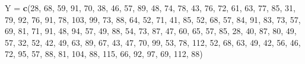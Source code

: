 \documentclass[
]{book}
\newenvironment{Shaded}{\begin{snugshade}}{\end{snugshade}}
\newcommand{\DecValTok}[1]{\textcolor[rgb]{0.00,0.00,0.81}{#1}}
\newcommand{\FunctionTok}[1]{\textcolor[rgb]{0.13,0.29,0.53}{\textbf{#1}}}
\newcommand{\NormalTok}[1]{#1}
\newcommand{\OtherTok}[1]{\textcolor[rgb]{0.56,0.35,0.01}{#1}}
\begin{document}
\begin{Shaded}
\begin{Highlighting}[]
\NormalTok{Y }\OtherTok{=} \FunctionTok{c}\NormalTok{(}\DecValTok{28}\NormalTok{, }\DecValTok{68}\NormalTok{, }\DecValTok{59}\NormalTok{, }\DecValTok{91}\NormalTok{, }\DecValTok{70}\NormalTok{, }\DecValTok{38}\NormalTok{, }\DecValTok{46}\NormalTok{, }\DecValTok{57}\NormalTok{, }\DecValTok{89}\NormalTok{, }\DecValTok{48}\NormalTok{, }\DecValTok{74}\NormalTok{, }\DecValTok{78}\NormalTok{, }\DecValTok{43}\NormalTok{, }\DecValTok{76}\NormalTok{, }\DecValTok{72}\NormalTok{, }\DecValTok{61}\NormalTok{, }\DecValTok{63}\NormalTok{, }\DecValTok{77}\NormalTok{, }
      \DecValTok{85}\NormalTok{, }\DecValTok{31}\NormalTok{, }\DecValTok{79}\NormalTok{, }\DecValTok{92}\NormalTok{, }\DecValTok{76}\NormalTok{, }\DecValTok{91}\NormalTok{, }\DecValTok{78}\NormalTok{, }\DecValTok{103}\NormalTok{, }\DecValTok{99}\NormalTok{, }\DecValTok{73}\NormalTok{, }\DecValTok{88}\NormalTok{, }\DecValTok{64}\NormalTok{, }\DecValTok{52}\NormalTok{, }\DecValTok{71}\NormalTok{, }\DecValTok{41}\NormalTok{, }\DecValTok{85}\NormalTok{, }\DecValTok{52}\NormalTok{, }\DecValTok{68}\NormalTok{, }
      \DecValTok{57}\NormalTok{, }\DecValTok{84}\NormalTok{, }\DecValTok{91}\NormalTok{, }\DecValTok{83}\NormalTok{, }\DecValTok{73}\NormalTok{, }\DecValTok{57}\NormalTok{, }\DecValTok{69}\NormalTok{, }\DecValTok{81}\NormalTok{, }\DecValTok{71}\NormalTok{, }\DecValTok{91}\NormalTok{, }\DecValTok{48}\NormalTok{, }\DecValTok{94}\NormalTok{, }\DecValTok{57}\NormalTok{, }\DecValTok{49}\NormalTok{, }\DecValTok{88}\NormalTok{, }\DecValTok{54}\NormalTok{, }\DecValTok{73}\NormalTok{, }
      \DecValTok{87}\NormalTok{, }\DecValTok{47}\NormalTok{, }\DecValTok{60}\NormalTok{, }\DecValTok{65}\NormalTok{, }\DecValTok{57}\NormalTok{, }\DecValTok{85}\NormalTok{, }\DecValTok{28}\NormalTok{, }\DecValTok{40}\NormalTok{, }\DecValTok{87}\NormalTok{, }\DecValTok{80}\NormalTok{, }\DecValTok{49}\NormalTok{, }\DecValTok{57}\NormalTok{, }\DecValTok{32}\NormalTok{, }\DecValTok{52}\NormalTok{, }\DecValTok{42}\NormalTok{, }\DecValTok{49}\NormalTok{, }\DecValTok{63}\NormalTok{, }\DecValTok{89}\NormalTok{, }
      \DecValTok{67}\NormalTok{, }\DecValTok{43}\NormalTok{, }\DecValTok{47}\NormalTok{, }\DecValTok{70}\NormalTok{, }\DecValTok{99}\NormalTok{, }\DecValTok{53}\NormalTok{, }\DecValTok{78}\NormalTok{, }\DecValTok{112}\NormalTok{, }\DecValTok{52}\NormalTok{, }\DecValTok{68}\NormalTok{, }\DecValTok{63}\NormalTok{, }\DecValTok{49}\NormalTok{, }\DecValTok{42}\NormalTok{, }
      \DecValTok{56}\NormalTok{, }\DecValTok{46}\NormalTok{, }\DecValTok{72}\NormalTok{, }\DecValTok{95}\NormalTok{, }\DecValTok{57}\NormalTok{, }\DecValTok{88}\NormalTok{, }\DecValTok{81}\NormalTok{, }\DecValTok{104}\NormalTok{, }\DecValTok{88}\NormalTok{, }\DecValTok{115}\NormalTok{, }\DecValTok{66}\NormalTok{, }\DecValTok{92}\NormalTok{, }\DecValTok{97}\NormalTok{, }\DecValTok{69}\NormalTok{, }\DecValTok{112}\NormalTok{, }\DecValTok{88}\NormalTok{)}


\end{Highlighting}
\end{Shaded}
\end{document}
